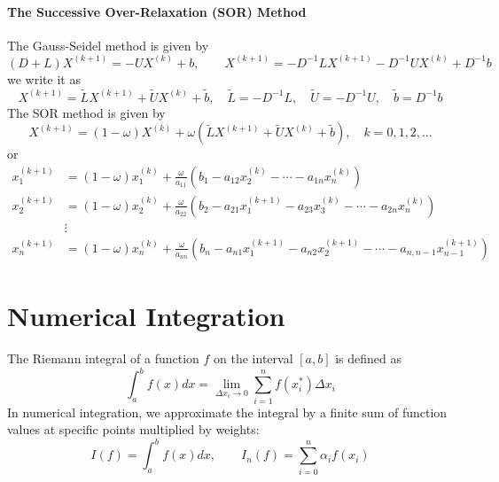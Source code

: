 \documentclass{matharticle}
\begin{document}
\paragraph{The Successive Over-Relaxation (SOR) Method}
The Gauss-Seidel method is given by
\begin{equation*}
	(D + L) X^{(k+1)} = - U X^{(k)} + b, \qquad X^{(k+1)} = -D^{-1} L X^{(k+1)} - D^{-1} U X^{(k)} + D^{-1} b
\end{equation*}
we write it as
\begin{equation*}
	X^{(k+1)} = \tilde{L} X^{(k+1)} + \tilde{U} X^{(k)} + \tilde{b}, \quad \tilde{L} = -D^{-1} L, \quad \tilde{U} = -D^{-1} U, \quad \tilde{b} = D^{-1} b
\end{equation*}
The SOR method is given by
\begin{equation}
	X^{(k+1)} = (1- \omega) X^{(k)} + \omega (\tilde{L} X^{(k+1)} + \tilde{U} X^{(k)} + \tilde{b}), \quad k = 0, 1, 2, \ldots
\end{equation}
or
\begin{equation}
	\begin{aligned}
		x_1^{(k+1)} & = (1 - \omega) x_1^{(k)} + \frac{\omega}{a_{11}} \left( b_1 - a_{12} x_2^{(k)} - \cdots - a_{1n} x_n^{(k)} \right)                                 \\
		x_2^{(k+1)} & = (1 - \omega) x_2^{(k)} + \frac{\omega}{a_{22}} \left( b_2 - a_{21} x_1^{(k+1)} - a_{23} x_3^{(k)} - \cdots - a_{2n} x_n^{(k)} \right)            \\
		            & \vdots                                                                                                                                             \\
		x_n^{(k+1)} & = (1 - \omega) x_n^{(k)} + \frac{\omega}{a_{nn}} \left( b_n - a_{n1} x_1^{(k+1)} - a_{n2} x_2^{(k+1)} - \cdots - a_{n,n-1} x_{n-1}^{(k+1)} \right)
	\end{aligned}
\end{equation}

\section{Numerical Integration}
The Riemann integral of a function $f$ on the interval $[a, b]$ is defined as
\begin{equation}
	\int_{a}^{b} f(x) dx = \lim_{\Delta x_i \to 0} \sum_{i=1}^{n} f(x_i^*) \Delta x_i
\end{equation}
In numerical integration, we approximate the integral by a finite sum of function values at specific points multiplied by weights:
\begin{equation}
	I(f) = \int_{a}^{b} f(x) dx, \qquad I_n(f) = \sum_{i=0}^{n} \alpha_i f(x_i)
\end{equation}
\end{document}
